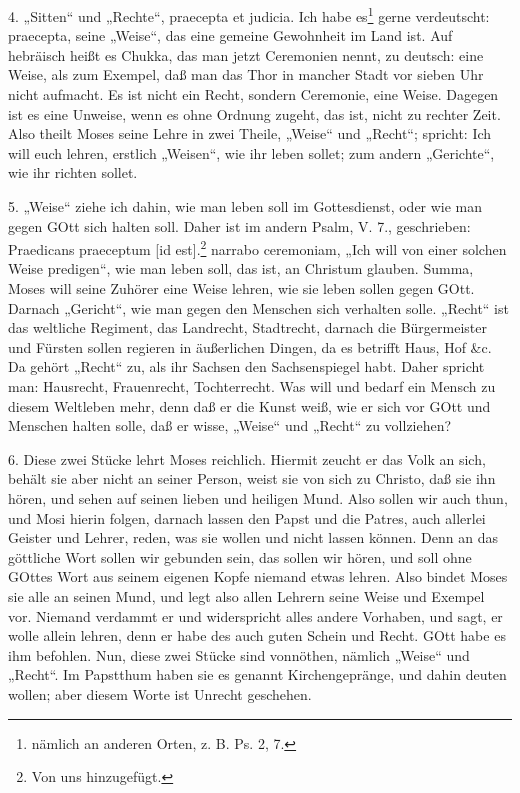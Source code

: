 4. „Sitten“ und „Rechte“, praecepta et judicia. Ich habe es\footnote{nämlich an anderen Orten, z. B. Ps. 2, 7.} gerne verdeutscht: praecepta, seine „Weise“, das eine gemeine Gewohnheit im Land ist. Auf hebräisch heißt es Chukka, das man jetzt Ceremonien nennt, zu deutsch: eine Weise, als zum Exempel, daß man das Thor in mancher Stadt vor sieben Uhr nicht aufmacht. Es ist nicht ein Recht, sondern Ceremonie, eine Weise. Dagegen ist es eine Unweise, wenn es ohne Ordnung zugeht, das ist, nicht zu rechter Zeit. Also theilt Moses seine Lehre in zwei Theile, „Weise“ und „Recht“; spricht: Ich will euch lehren, erstlich „Weisen“, wie ihr leben sollet; zum andern „Gerichte“, wie ihr richten sollet.

5. „Weise“ ziehe ich dahin, wie man leben soll im Gottesdienst, oder wie man gegen GOtt sich halten soll. Daher ist im andern Psalm, V. 7., geschrieben: Praedicans praeceptum [id est].\footnote{Von uns hinzugefügt.} narrabo ceremoniam, „Ich will von einer solchen Weise predigen“, wie man leben soll, das ist, an Christum glauben. Summa, Moses will seine Zuhörer eine Weise lehren, wie sie leben sollen gegen GOtt. Darnach „Gericht“, wie man gegen den Menschen sich verhalten solle. „Recht“ ist das weltliche Regiment, das Landrecht, Stadtrecht, darnach die Bürgermeister und Fürsten sollen regieren in äußerlichen Dingen, da es betrifft Haus, Hof \&c. Da gehört „Recht“ zu, als ihr Sachsen den Sachsenspiegel habt. Daher spricht man: Hausrecht, Frauenrecht, Tochterrecht. Was will und bedarf ein Mensch zu diesem Weltleben mehr, denn daß er die Kunst weiß, wie er sich vor GOtt und Menschen halten solle, daß er wisse, „Weise“ und „Recht“ zu vollziehen?

6. Diese zwei Stücke lehrt Moses reichlich. Hiermit zeucht er das Volk an sich, behält sie aber nicht an seiner Person, weist sie von sich zu Christo, daß sie ihn hören, und sehen auf seinen lieben und heiligen Mund. Also sollen wir auch thun, und Mosi hierin folgen, darnach lassen den Papst und die Patres, auch allerlei Geister und Lehrer, reden, was sie wollen und nicht lassen können. Denn an das göttliche Wort sollen wir gebunden sein, das sollen wir hören, und soll ohne GOttes Wort aus seinem eigenen Kopfe niemand etwas lehren. Also bindet Moses sie alle an seinen Mund, und legt also allen Lehrern seine Weise und Exempel vor. Niemand verdammt er und widerspricht alles andere Vorhaben, und sagt, er wolle allein lehren, denn er habe des auch guten Schein und Recht. GOtt habe es ihm befohlen. Nun, diese zwei Stücke sind vonnöthen, nämlich „Weise“ und „Recht“. Im Papstthum haben sie es genannt Kirchengepränge, und dahin deuten wollen; aber diesem Worte ist Unrecht geschehen.

